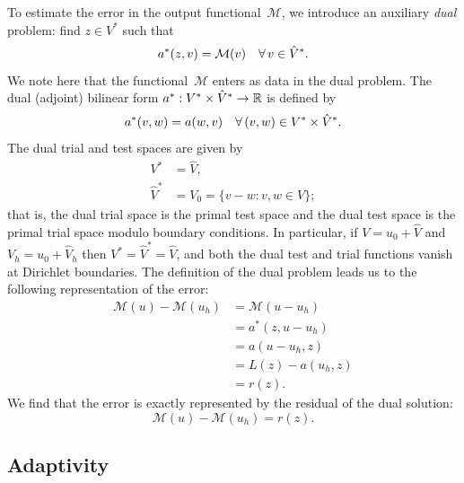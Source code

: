 To estimate the error in the output functional~$\mathcal{M}$, we
introduce an auxiliary \emph{dual} problem: find $z \in V^*$ such that
\begin{equation} \label{eq:varproblem,dual}
  a^*(z, v) = \mathcal{M}(v) \quad \forall\, v \in \hat{V}^*.
\end{equation}
We note here that the functional~$\mathcal{M}$ enters as data in the
dual problem. The dual (adjoint) bilinear form $a^* : V^* \times
\hat{V}^* \rightarrow \mathbb{R}$ is defined by
\begin{equation}
  a^*(v, w) = a(w, v) \quad \forall\, (v, w) \in V^* \times \hat{V}^*.
\end{equation}
The dual trial and test spaces are given by
\begin{equation}
  \begin{split}
    V^* &= \hat{V},
    \\
    \hat{V}^* &= V_0 = \{v - w : v, w \in V\};
  \end{split}
\end{equation}
that is, the dual trial space is the primal test space and the dual
test space is the primal trial space modulo boundary conditions. In
particular, if $V = u_0 + \hat{V}$ and $V_h = u_0 + \hat{V}_h$ then
$V^* = \hat{V}^* = \hat{V}$, and both the dual test and trial
functions vanish at Dirichlet boundaries. The definition of the dual
problem leads us to the following representation of the error:
\begin{equation}
  \begin{split}
    \mathcal{M}(u) - \mathcal{M}(u_h)
    &= \mathcal{M}(u - u_h)
    \\
    &= a^*(z, u - u_h)
    \\
    &= a(u - u_h, z)
    \\
    &= L(z) - a(u_h, z)
    \\
    &= r(z).
  \end{split}
\end{equation}
We find that the error is exactly represented by the residual of the
dual solution:
\begin{equation} \label{eq:aposteriori,dual}
  \mathcal{M}(u) - \mathcal{M}(u_h) = r(z).
\end{equation}

\subsection{Adaptivity}

